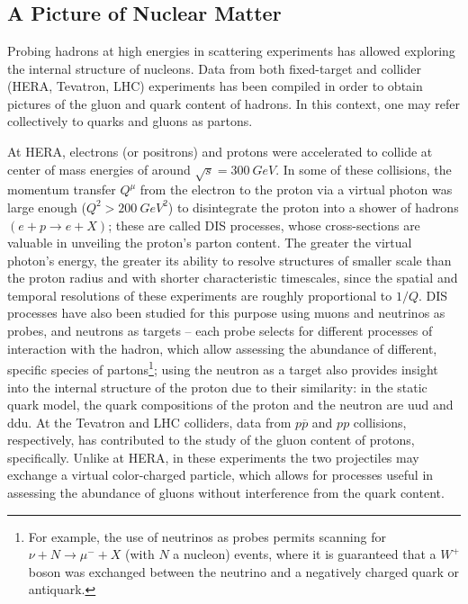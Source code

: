 \chapter{}

\section{A Picture of Nuclear Matter}
\label{sec:nuclear_matter}



Probing hadrons at high energies in scattering experiments has allowed exploring the internal structure of nucleons. Data from  both fixed-target and collider (\gls{HERA}, Tevatron, \gls{LHC}) experiments has been compiled in order to obtain pictures of the gluon and quark content of hadrons. In this context, one may refer collectively to quarks and gluons as partons.

At \gls{HERA}, electrons (or positrons) and protons were accelerated to collide at center of mass energies of around $\sqrt{s} = \qty{300}{GeV}$. In some of these collisions, the momentum transfer $Q^\mu$ from the electron to the proton via a virtual photon was large enough ($Q^2 > \qty{200}{GeV^2}$) to disintegrate the proton into a shower of hadrons $(e  + p \to e + X)$; these are called \gls{DIS} processes, whose cross-sections are valuable in unveiling the proton's parton content. The greater the virtual photon's energy, the greater its ability to resolve structures of smaller scale than the proton radius and with shorter characteristic timescales, since the spatial and temporal resolutions of these experiments are roughly proportional to $1/Q$.
 \gls{DIS} processes have also been studied for this purpose using muons and neutrinos as probes, and neutrons as targets -- each probe selects for different processes of interaction with the hadron, which allow assessing the abundance of different, specific species of partons\footnote{For example, the use of neutrinos as probes permits scanning for $\nu + N \to \mu^- + X$ (with $N$ a nucleon) events, where it is guaranteed that a $W^+$ boson was exchanged between the neutrino and a negatively charged quark or antiquark.}; using the neutron as a target also provides insight into the internal structure of the proton due to their similarity: in the static quark model, the quark compositions of the proton and the neutron are uud and ddu. At the Tevatron and LHC colliders, data from $p\overline{p}$ and $pp$ collisions, respectively, has contributed to the study of the gluon content of protons, specifically. \cite{Thomson8:2013,PDG_2024} Unlike at HERA, in these experiments the two projectiles may exchange a virtual color-charged particle, which allows for processes useful in assessing the abundance of gluons without interference from the quark content. \cite[Table 18.1]{PDG_2024}

